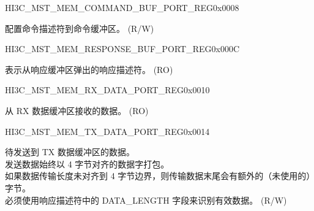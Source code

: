 \begin{register}{H}{I3C\_MST\_MEM\_COMMAND\_BUF\_PORT\_REG}{0x0008}\label{regdesc:I3CMSTMEMCOMMANDBUFPORTREG}
%
\regnewline%
\begin{regdesc}\begin{reglist}
\label{fielddesc:I3CMSTMEMCOMMAND}\item [I3C\_MST\_MEM\_COMMAND] 配置命令描述符到命令缓冲区。 (R/W)
\end{reglist}\end{regdesc}
\end{register}


\begin{register}{H}{I3C\_MST\_MEM\_RESPONSE\_BUF\_PORT\_REG}{0x000C}\label{regdesc:I3CMSTMEMRESPONSEBUFPORTREG}
%
\regnewline%
\begin{regdesc}\begin{reglist}
\label{fielddesc:I3CMSTMEMRESPONSE}\item [I3C\_MST\_MEM\_RESPONSE] 表示从响应缓冲区弹出的响应描述符。 (RO)
\end{reglist}\end{regdesc}
\end{register}


\begin{register}{H}{I3C\_MST\_MEM\_RX\_DATA\_PORT\_REG}{0x0010}\label{regdesc:I3CMSTMEMRXDATAPORTREG}
%
\regnewline%
\begin{regdesc}\begin{reglist}
\label{fielddesc:I3CMSTMEMRXDATAPORT}\item [I3C\_MST\_MEM\_RX\_DATA\_PORT] 从 RX 数据缓冲区接收的数据。 (RO)
\end{reglist}\end{regdesc}
\end{register}


\begin{register}{H}{I3C\_MST\_MEM\_TX\_DATA\_PORT\_REG}{0x0014}\label{regdesc:I3CMSTMEMTXDATAPORTREG}
%
\regnewline%
\begin{regdesc}\begin{reglist}
\label{fielddesc:I3CMSTMEMTXDATAPORT}\item [I3C\_MST\_MEM\_TX\_DATA\_PORT] 待发送到 TX 数据缓冲区的数据。\\
发送数据始终以 4 字节对齐的数据字打包。\\
如果数据传输长度未对齐到 4 字节边界，则传输数据末尾会有额外的（未使用的）字节。\\
必须使用响应描述符中的 DATA\_LENGTH 字段来识别有效数据。 (R/W)
\end{reglist}\end{regdesc}
\end{register}



